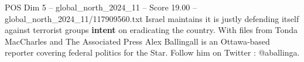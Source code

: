 \begin{textsample}{POS Dim 5 – global\_north\_2024\_11 – Score 19.00 – global\_north\_2024\_11/117909560.txt}
Israel maintains it is justly defending itself against terrorist groups \textbf{intent} on eradicating the country.
With files from Tonda MacCharles and The Associated Press Alex Ballingall is an Ottawa-based reporter covering federal politics for the Star.
Follow him on Twitter : @aballinga.

\end{textsample}
